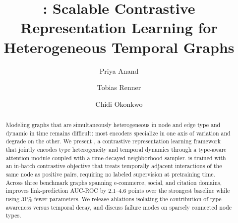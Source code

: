 \documentclass[sigconf,anonymous,review]{acmart}
\begin{document}
\title{\sysname: Scalable Contrastive Representation Learning for Heterogeneous Temporal Graphs}

\author{Priya Anand}

\author{Tobias Renner}

\author{Chidi Okonkwo}

\renewcommand{\shortauthors}{Anand et al.}

\begin{abstract}
Modeling graphs that are simultaneously heterogeneous in node and edge type and dynamic in
time remains difficult: most encoders specialize in one axis of variation and degrade on the
other. We present \sysname{}, a contrastive representation learning framework that jointly
encodes type heterogeneity and temporal dynamics through a type-aware attention module
coupled with a time-decayed neighborhood sampler. \sysname{} is trained with an in-batch
contrastive objective that treats temporally adjacent interactions of the same node as
positive pairs, requiring no labeled supervision at pretraining time. Across three benchmark
graphs spanning e-commerce, social, and citation domains, \sysname{} improves link-prediction
AUC-ROC by 2.1--4.6 points over the strongest baseline while using 31\% fewer parameters. We
release ablations isolating the contribution of type-awareness versus temporal decay, and
discuss failure modes on sparsely connected node types.
\end{abstract}



\maketitle
\end{document}
